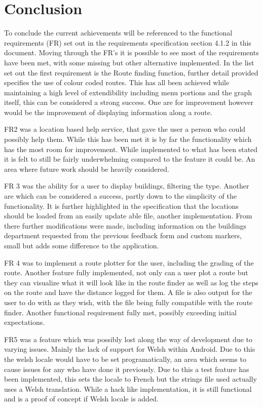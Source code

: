 \section{Conclusion}
To conclude the current achievements will be referenced to the functional requirements (FR) set out in the requirements specification section 4.1.2 in this document. Moving through the FR's it is possible to see most of the requirements have been met, with some missing but other alternative implemented. In the list set out the first requirement is the Route finding function, further detail provided specifies the use of colour coded routes. This has all been achieved while maintaining a high level of extendibility including menu portions and the graph itself, this can be considered a strong success. One are for improvement however would be the improvement of displaying information along a route. 

FR2 was a location based help service, that gave the user a person who could possibly help them. While this has been met it is by far the functionality which has the most room for improvement. While implemented to what has been stated it is felt to still be fairly underwhelming compared to the feature it could be. An area where future work should be heavily considered.

FR 3 was the ability for a user to display buildings, filtering the type. Another are which can be considered a success, partly down to the simplicity of the functionality. It is further highlighted in the specification that the locations should be loaded from an easily update able file, another implementation. From there further modifications were made, including information on the buildings department requested from the previous feedback form and custom markers, small but adds some difference to the application. 

FR 4 was to implement a route plotter for the user, including the grading of the route. Another feature fully implemented, not only can a user plot a route but they can visualize what it will look like in the route finder as well as log the steps on the route and have the distance logged for them. A file is also output for the user to do with as they wish, with the file being fully compatible with the route finder. Another functional requirement fully met, possibly exceeding initial expectations.

FR5 was a feature which was possibly lost along the way of development due to varying issues. Mainly the lack of support for Welsh within Android. Due to this the welsh locale would have to be set programatically, an area which seems to cause issues for any who have done it previously. Due to this a test feature has been implemented, this sets the locale to French but the strings file used actually uses a Welsh translation. While a hack like implementation, it is still functional and is a proof of concept if Welsh locale is added.

